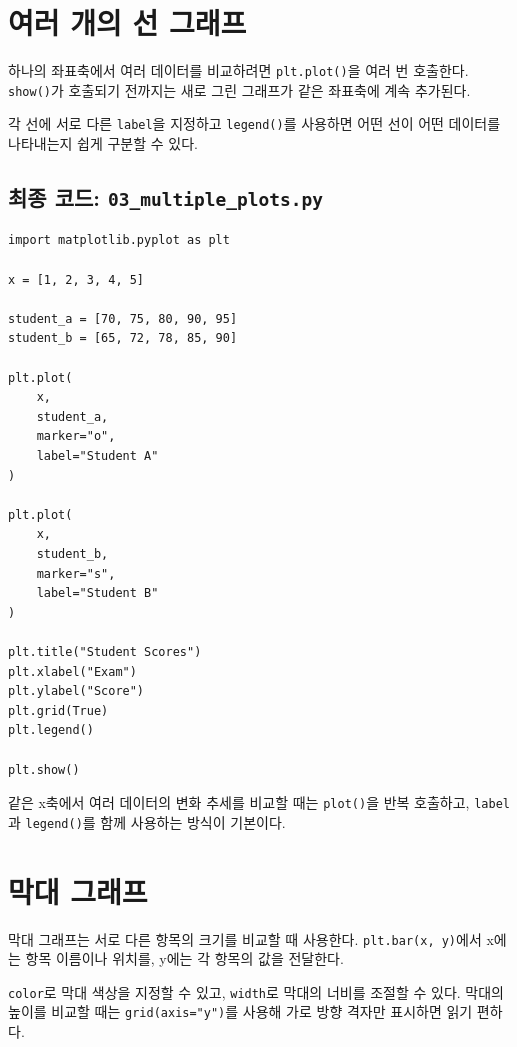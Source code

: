 \documentclass[11pt,a4paper]{article}
\begin{document}
\section{여러 개의 선 그래프}

하나의 좌표축에서 여러 데이터를 비교하려면 \texttt{plt.plot()}을 여러 번 호출한다. \texttt{show()}가 호출되기 전까지는 새로 그린 그래프가 같은 좌표축에 계속 추가된다.

각 선에 서로 다른 \texttt{label}을 지정하고 \texttt{legend()}를 사용하면 어떤 선이 어떤 데이터를 나타내는지 쉽게 구분할 수 있다.

\subsection{최종 코드: \texttt{03\_multiple\_plots.py}}

\begin{lstlisting}
import matplotlib.pyplot as plt

x = [1, 2, 3, 4, 5]

student_a = [70, 75, 80, 90, 95]
student_b = [65, 72, 78, 85, 90]

plt.plot(
    x,
    student_a,
    marker="o",
    label="Student A"
)

plt.plot(
    x,
    student_b,
    marker="s",
    label="Student B"
)

plt.title("Student Scores")
plt.xlabel("Exam")
plt.ylabel("Score")
plt.grid(True)
plt.legend()

plt.show()
\end{lstlisting}

\begin{importantbox}
같은 x축에서 여러 데이터의 변화 추세를 비교할 때는 \texttt{plot()}을 반복 호출하고, \texttt{label}과 \texttt{legend()}를 함께 사용하는 방식이 기본이다.
\end{importantbox}

\section{막대 그래프}

막대 그래프는 서로 다른 항목의 크기를 비교할 때 사용한다. \texttt{plt.bar(x, y)}에서 x에는 항목 이름이나 위치를, y에는 각 항목의 값을 전달한다.

\texttt{color}로 막대 색상을 지정할 수 있고, \texttt{width}로 막대의 너비를 조절할 수 있다. 막대의 높이를 비교할 때는 \texttt{grid(axis="y")}를 사용해 가로 방향 격자만 표시하면 읽기 편하다.
\end{document}
